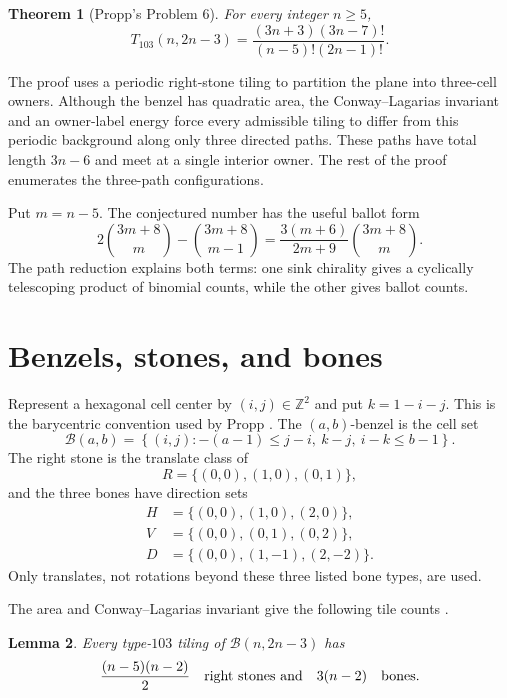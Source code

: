 \documentclass[11pt]{amsart}
\newtheorem{theorem}{Theorem}[section]
\newtheorem{lemma}[theorem]{Lemma}
\theoremstyle{definition}
\newcommand{\Bz}{\mathcal B}
\begin{document}
\begin{theorem}[Propp's Problem 6]\label{thm:main}
For every integer $n\geq5$,
\[
 T_{103}(n,2n-3)
 =\frac{(3n+3)(3n-7)!}{(n-5)!(2n-1)!}.
\]
\end{theorem}

The proof uses a periodic right-stone tiling to partition the plane into
three-cell owners.  Although the benzel has quadratic area, the
Conway--Lagarias invariant and an owner-label energy force every admissible
tiling to differ from this periodic background along only three directed
paths.  These paths have total length $3n-6$ and meet at a single interior
owner.  The rest of the proof enumerates the three-path configurations.

Put $m=n-5$.  The conjectured number has the useful ballot form
\begin{equation}\label{eq:ballot-form}
 2\binom{3m+8}{m}-\binom{3m+8}{m-1}
 =\frac{3(m+6)}{2m+9}\binom{3m+8}{m}.
\end{equation}
The path reduction explains both terms: one sink chirality gives a cyclically
telescoping product of binomial counts, while the other gives ballot counts.

\section{Benzels, stones, and bones}

Represent a hexagonal cell center by $(i,j)\in\mathbb Z^2$ and put
$k=1-i-j$.  This is the barycentric convention used by Propp
\cite{ProppProblems}.  The $(a,b)$-benzel is the cell set
\[
 \Bz(a,b)=\left\{(i,j):
 -(a-1)\leq j-i,\ k-j,\ i-k\leq b-1\right\}.
\]
The right stone is the translate class of
\[
 R=\{(0,0),(1,0),(0,1)\},
\]
and the three bones have direction sets
\[
\begin{aligned}
 H&=\{(0,0),(1,0),(2,0)\},\\
 V&=\{(0,0),(0,1),(0,2)\},\\
 D&=\{(0,0),(1,-1),(2,-2)\}.
\end{aligned}
\]
Only translates, not rotations beyond these three listed bone types, are
used.

The area and Conway--Lagarias invariant give the following tile counts
\cite{ConwayLagarias,ProppProblems}.

\begin{lemma}\label{lem:tile-counts}
Every type-$103$ tiling of $\Bz(n,2n-3)$ has
\[
 \frac{(n-5)(n-2)}2
 \quad\hbox{right stones and}\quad
 3(n-2)\quad\hbox{bones}.
\]
\end{lemma}
\end{document}
